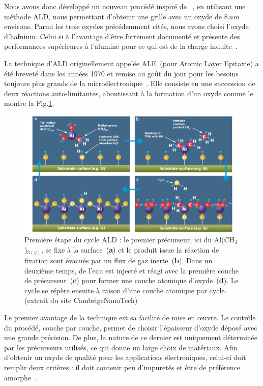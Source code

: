 Nous avons donc développé un nouveau procédé inspiré de~\cite{Biercuk2003} , en utilisant une méthode ALD, nous permettant d'obtenir une grille avec un oxyde de $8\,nm$ environs. Parmi les trois oxydes précédemment cités, nous avons choisi l'oxyde d'hafnium. Celui si à l'avantage d'être fortement documenté et présente des performances supérieures à l'alumine pour ce qui est de la charge induite~\cite{Biercuk2003}. 

La technique d'ALD originellement appelée ALE~(pour Atomic Layer Epitaxie) a été breveté dans les années 1970 et remise au goût du jour pour les besoins toujours plus grands de la microélectronique~\cite{Leskelae2003}. Elle consiste en une succession de deux réactions auto-limitantes, aboutissant à la formation d'un oxyde comme le montre la Fig.\ref{ALD}.

\begin{figure}
\centering \includegraphics[scale=0.45]{Fabrication/ALD/ALD.pdf}
\caption{Première étape du cycle ALD : le premier précurseur, ici du Al(CH$_3$)$_{3(g)}$, se fixe à la surface~(\textbf{a}) et le produit issue la réaction de fixation sont évacués par un flux de gaz inerte~(\textbf{b}). Dans un deuxième temps, de l'eau est injecté et réagi avec la première couche de précurseur~(\textbf{c}) pour former une couche atomique d'oxyde~(\textbf{d}). Le cycle se répère ensuite à raison d'une couche atomique par cycle. (extrait du site CambrigeNanoTech)}
\label{ALD}
\end{figure}


Le premier avantage de la technique est sa facilité de mise en œuvre. Le contrôle du procédé, couche par couche, permet de choisir l'épaisseur d'oxyde déposé avec une grande précision. De plus, la nature de ce dernier est uniquement déterminée par les précurseurs utilisés, ce qui donne un large choix de matériaux. Afin d'obtenir un oxyde de qualité pour les applications électroniques, celui-ci doit remplir deux critères : il doit contenir peu d'impuretés et être de préférence amorphe~\cite{Kim2003}.

